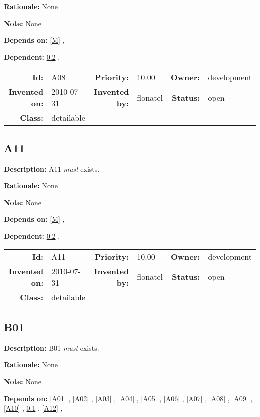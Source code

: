 \textbf{Rationale:} None

\textbf{Note:} None

\textbf{Depends on:} \ref{M} , 

\textbf{Dependent:} \ref{B01} , 

\par
{\small \begin{center}\begin{tabular}{rlrlrl}
\textbf{Id:} & A08 & \textbf{Priority:} & 10.00 & \textbf{Owner:} & development \\ 
\textbf{Invented on:} & 2010-07-31 & \textbf{Invented by:} & flonatel & \textbf{Status:} & open \\ 
\textbf{Class:} & detailable & & & & \\ 
\end{tabular}\end{center} }%
\subsection{A11}\label{A11}
\textbf{Description:} A11 \textsl{must} exists.

\textbf{Rationale:} None

\textbf{Note:} None

\textbf{Depends on:} \ref{M} , 

\textbf{Dependent:} \ref{B01} , 

\par
{\small \begin{center}\begin{tabular}{rlrlrl}
\textbf{Id:} & A11 & \textbf{Priority:} & 10.00 & \textbf{Owner:} & development \\ 
\textbf{Invented on:} & 2010-07-31 & \textbf{Invented by:} & flonatel & \textbf{Status:} & open \\ 
\textbf{Class:} & detailable & & & & \\ 
\end{tabular}\end{center} }%
\subsection{B01}\label{B01}
\textbf{Description:} B01 \textsl{must} exists.

\textbf{Rationale:} None

\textbf{Note:} None

\textbf{Depends on:} \ref{A01} , \ref{A02} , \ref{A03} , \ref{A04} , \ref{A05} , \ref{A06} , \ref{A07} , \ref{A08} , \ref{A09} , \ref{A10} , \ref{A11} , \ref{A12} , 

